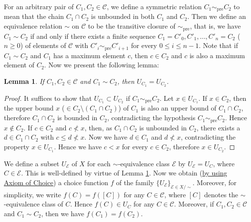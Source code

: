 \documentclass{article}
\newtheorem{lemma}{Lemma}
\begin{document}
For an arbitrary pair of $C_1,C_2 \in \mathcal{C}$, we define a symmetric relation $C_1 \sim_{\mathrm{pre}} C_2$ to mean that the chain $C_1 \cap C_2$ is unbounded in both $C_1$ and $C_2$.
Then we define an equivalence relation $\sim$ on $\mathcal{C}$ to be the transitive closure of $\sim_{\mathrm{pre}}$, that is, we have $C_1 \sim C_2$ if and only if there exists a finite sequence $C_1 = C'_0,C'_1,\dots,C'_n = C_2$ ($n \geq 0$) of elements of $\mathcal{C}$ with $C'_i \sim_{\mathrm{pre}} C'_{i+1}$ for every $0 \leq i \leq n-1$.
Note that if $C_1 \sim C_2$ and $C_1$ has a maximum element $c$, then $c \in C_2$ and $c$ is also a maximum element of $C_2$.
Now we present the following lemma:
\begin{lemma}
\label{lem:common_upper_bound_for_equivalent_chains}
If $C_1,C_2 \in \mathcal{C}$ and $C_1 \sim C_2$, then $U_{C_1} = U_{C_2}$.
\end{lemma}
\begin{proof}
It suffices to show that $U_{C_1} \subset U_{C_2}$ if $C_1 \sim_{\mathrm{pre}} C_2$.
Let $x \in U_{C_1}$.
If $x \in C_2$, then the upper bound $x$ ($\in C_2 \setminus (C_1 \cap C_2)$) of $C_1$ is also an upper bound of $C_1 \cap C_2$, therefore $C_1 \cap C_2$ is bounded in $C_2$, contradicting the hypothesis $C_1 \sim_{\mathrm{pre}} C_2$.
Hence $x \not\in C_2$.
If $c \in C_2$ and $c \nless x$, then, as $C_1 \cap C_2$ is unbounded in $C_2$, there exists a $d \in C_1 \cap C_2$ with $c \leq d \nless x$.
Now we have $d \in C_1$ and $d \nless x$, contradicting the property $x \in U_{C_1}$.
Hence we have $c < x$ for every $c \in C_2$, therefore $x \in U_{C_2}$.
\end{proof}
We define a subset $U_{\mathcal{E}}$ of $X$ for each $\sim$-equivalence class $\mathcal{E}$ by $U_{\mathcal{E}} = U_C$, where $C \in \mathcal{E}$.
This is well-defined by virtue of Lemma \ref{lem:common_upper_bound_for_equivalent_chains}.
Now we obtain (\underline{by using Axiom of Choice}) a choice function $f$ of the family $\{U_{\mathcal{E}}\}_{\mathcal{E} \in X/{\sim}}$.
Moreover, for simplicity, we write $f(C) = f([C])$ for any $C \in \mathcal{C}$, where $[C]$ denotes the $\sim$-equivalence class of $C$.
Hence $f(C) \in U_C$ for any $C \in \mathcal{C}$.
Moreover, if $C_1,C_2 \in \mathcal{C}$ and $C_1 \sim C_2$, then we have $f(C_1) = f(C_2)$.
\end{document}
